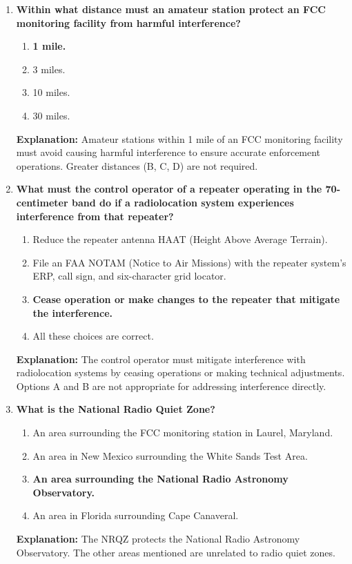 \begin{enumerate}
    \item \textbf{Within what distance must an amateur station protect an FCC monitoring facility from harmful interference?}
    \begin{enumerate}
        \item \textbf{1 mile.}\\
        \item 3 miles.\\
        \item 10 miles.\\
        \item 30 miles.
    \end{enumerate}
    \textbf{Explanation:} Amateur stations within 1 mile of an FCC monitoring facility must avoid causing harmful interference to ensure accurate enforcement operations. Greater distances (B, C, D) are not required.

    \item \textbf{What must the control operator of a repeater operating in the 70-centimeter band do if a radiolocation system experiences interference from that repeater?}
    \begin{enumerate}
        \item Reduce the repeater antenna HAAT (Height Above Average Terrain).\\
        \item File an FAA NOTAM (Notice to Air Missions) with the repeater system's ERP, call sign, and six-character grid locator.\\
        \item \textbf{Cease operation or make changes to the repeater that mitigate the interference.}\\
        \item All these choices are correct.
    \end{enumerate}
    \textbf{Explanation:} The control operator must mitigate interference with radiolocation systems by ceasing operations or making technical adjustments. Options A and B are not appropriate for addressing interference directly.

    \item \textbf{What is the National Radio Quiet Zone?}
    \begin{enumerate}
        \item An area surrounding the FCC monitoring station in Laurel, Maryland.\\
        \item An area in New Mexico surrounding the White Sands Test Area.\\
        \item \textbf{An area surrounding the National Radio Astronomy Observatory.}\\
        \item An area in Florida surrounding Cape Canaveral.
    \end{enumerate}
    \textbf{Explanation:} The NRQZ protects the National Radio Astronomy Observatory. The other areas mentioned are unrelated to radio quiet zones.


\end{enumerate}
